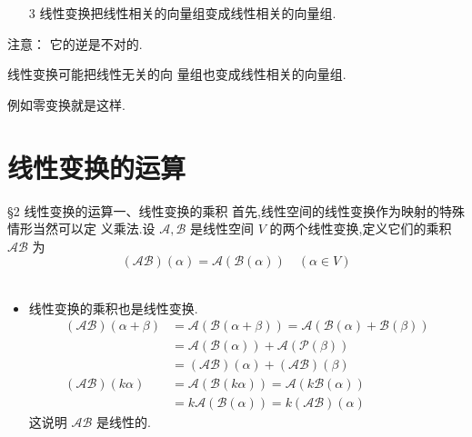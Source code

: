\documentclass[13pt]{beamer}
\def\A{\mathscr{A}}
\begin{document}
\begin{frame}


\begin{itemize}
	\item[3] 线性变换把线性相关的向量组变成线性相关的向量组.  

\end{itemize}


	注意： \alert{它的逆是不对的.}
	
	线性变换可能把线性无关的向 量组也变成线性相关的向量组.
	
	例如零变换就是这样.


\end{frame}
\section{线性变换的运算}
\begin{frame}{\S 2 线性变换的运算}{一、线性变换的乘积}
首先,线性空间的线性变换作为映射的特殊情形当然可以定
义乘法.设 $\mathscr{A}, \mathscr{B}$ 是线性空间 $V$ 的两个线性变换,定义它们的\alert{乘积} $\mathscr{A B}$ 为
\[
(\mathscr{A} \mathscr{B})({\alpha})=\mathscr{A}(\mathscr{B}({\alpha})) \quad({\alpha} \in V)
\]
\\[-10pt]
\begin{itemize}
	\item {线性变换的乘积也是线性变换.} 
	\[
	\begin{aligned}
	(\mathscr{A} \mathscr{B})({\alpha}+{\beta}) &=\mathscr{A}(\mathscr{B}({\alpha}+{\beta}))=\mathscr{A}(\mathscr{B}({\alpha})+\mathscr{B}({\beta})) \\
	&=\mathscr{A}(\mathscr{B}({\alpha}))+\mathscr{A}(\mathscr{P}({\beta})) \\
	&=(\A \mathscr{B})({\alpha})+(\mathscr{A} \mathscr{B})({\beta}) \\
	(\mathscr{A} \mathscr{B})(k {\alpha}) &=\mathscr{A}(\mathscr{B}(k {\alpha}))=\mathscr{A}(k \mathscr{B}({\alpha})) \\
	&=k \mathscr{A}(\mathscr{B}({\alpha}))=k(\mathscr{A} \mathscr{B})({\alpha})
	\end{aligned}
	\]
	这说明 $\A \mathscr{B}$ 是线性的.  
\end{itemize}

\end{frame}
\end{document}
